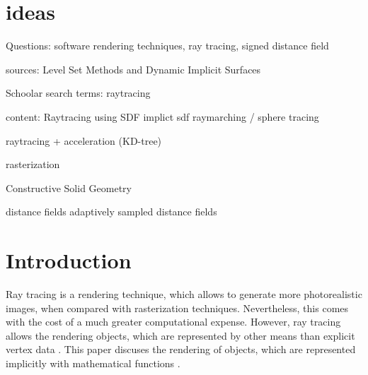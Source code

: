 
\section{ideas}
Questions: software rendering techniques, ray tracing, signed distance field

sources: Level Set Methods and Dynamic Implicit Surfaces

Schoolar search terms: 
raytracing


content:
Raytracing using SDF
implict
sdf
raymarching / sphere tracing

raytracing + acceleration (KD-tree)

rasterization

Constructive Solid Geometry

distance fields
adaptively sampled distance fields

\section{Introduction}
\label{section:Introduction}


Ray tracing is a rendering technique, which allows to generate more photorealistic images, when compared with rasterization techniques. Nevertheless, this comes with the cost of a much greater computational expense. However, ray tracing allows the rendering objects, which are represented by other means than explicit vertex data \cite{bungartz:2013:einfuhrung}. This paper discuses the rendering of objects, which are represented implicitly with mathematical functions \cite{osher:2006:level}.  
